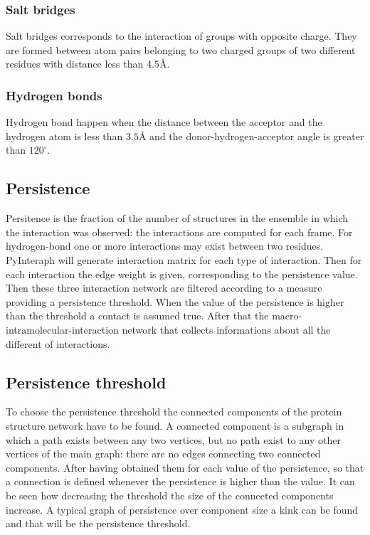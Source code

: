 		\subsubsection{Salt bridges}
		Salt bridges corresponds to the interaction of groups with opposite charge.
		They are formed between atom pairs belonging to two charged groups of two different residues with distance less than $4.5\si{\angstrom}$.

		\subsubsection{Hydrogen bonds}
		Hydrogen bond happen when the distance between the acceptor and the hydrogen atom is less than $3.5\si{\angstrom}$ and the donor-hydrogen-acceptor angle is greater than $120^\circ$.

	\subsection{Persistence}
	Persitence is the fraction of the number of structures in the ensemble in which the interaction was observed: the interactions are computed for each frame.
	For hydrogen-bond one or more interactions may exist between two residues.
	PyInteraph will generate interaction matrix for each type of interaction.
	Then for each interaction the edge weight is given, corresponding to the persistence value.
	Then these three interaction network are filtered according to a measure providing a persistence threshold.
	When the value of the persistence is higher than the threshold a contact is assumed true.
	After that the macro-intramolecular-interaction network that collects informations about all the different of interactions.

	\subsection{Persistence threshold}
	To choose the persistence threshold the connected components of the protein structure network have to be found.
	A connected component is a subgraph in which a path exists between any two vertices, but no path exist to any other vertices of the main graph: there are no edges connecting two connected components.
	After having obtained them for each value of the persistence, so that a connection is defined whenever the persistence is higher than the value.
	It can be seen how decreasing the threshold the size of the connected components increase.
	A typical graph of persistence over component size a kink can be found and that will be the persistence threshold.


